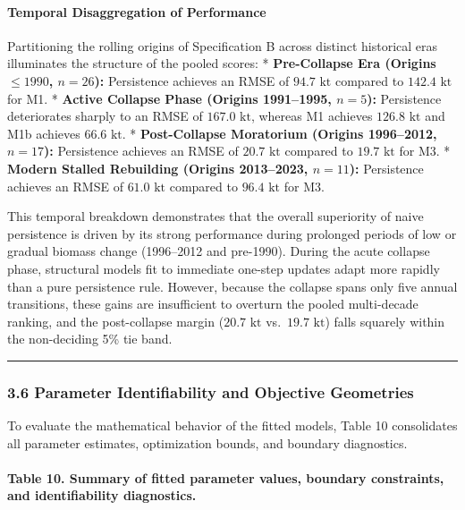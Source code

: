 \documentclass[11pt]{article}
\begin{document}
\paragraph{Temporal Disaggregation of
Performance}\label{temporal-disaggregation-of-performance}

Partitioning the rolling origins of Specification B across distinct
historical eras illuminates the structure of the pooled scores: *
\textbf{Pre-Collapse Era (Origins \(\le 1990\), \(n=26\)):} Persistence
achieves an RMSE of \(94.7\text{ kt}\) compared to \(142.4\text{ kt}\)
for M1. * \textbf{Active Collapse Phase (Origins 1991--1995, \(n=5\)):}
Persistence deteriorates sharply to an RMSE of \(167.0\text{ kt}\),
whereas M1 achieves \(126.8\text{ kt}\) and M1b achieves
\(66.6\text{ kt}\). * \textbf{Post-Collapse Moratorium (Origins
1996--2012, \(n=17\)):} Persistence achieves an RMSE of
\(20.7\text{ kt}\) compared to \(19.7\text{ kt}\) for M3. *
\textbf{Modern Stalled Rebuilding (Origins 2013--2023, \(n=11\)):}
Persistence achieves an RMSE of \(61.0\text{ kt}\) compared to
\(96.4\text{ kt}\) for M3.

This temporal breakdown demonstrates that the overall superiority of
naive persistence is driven by its strong performance during prolonged
periods of low or gradual biomass change (1996--2012 and pre-1990).
During the acute collapse phase, structural models fit to immediate
one-step updates adapt more rapidly than a pure persistence rule.
However, because the collapse spans only five annual transitions, these
gains are insufficient to overturn the pooled multi-decade ranking, and
the post-collapse margin (\(20.7\text{ kt}\) vs.~\(19.7\text{ kt}\))
falls squarely within the non-deciding 5\% tie band.

\begin{center}\rule{0.5\linewidth}{0.5pt}\end{center}

\subsubsection{3.6 Parameter Identifiability and Objective
Geometries}\label{parameter-identifiability-and-objective-geometries}

To evaluate the mathematical behavior of the fitted models, Table 10
consolidates all parameter estimates, optimization bounds, and boundary
diagnostics.

\paragraph{Table 10. Summary of fitted parameter values, boundary
constraints, and identifiability
diagnostics.}\label{table-10.-summary-of-fitted-parameter-values-boundary-constraints-and-identifiability-diagnostics.}
\end{document}
